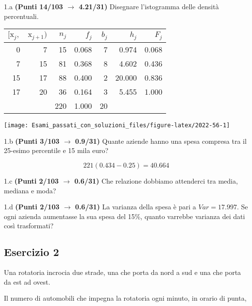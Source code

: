 \documentclass[
  11pt,
]{book}
\theoremstyle{mytheoremstyle}
\theoremstyle{mydefstyle}
\newenvironment{sol}
  {
  \begin{tcolorbox}[enhanced,breakable,arc=0.1mm,boxrule=1pt,colback=white,colframe=iblue,
  title=\bf \fontfamily{lmss}\selectfont \hspace{.5 cm} Soluzione,drop fuzzy shadow]

}{
\end{tcolorbox}
  }
\begin{document}
1.a \textbf{(Punti 14/103 \(\rightarrow\) 4.21/31)} Disegnare l'istogramma delle densità percentuali.

\begin{sol}

\begin{table}[H]
\centering
\begin{tabular}{rrrrrrr}
\toprule
$[\text{x}_j,$ & $\text{x}_{j+1})$ & $n_j$ & $f_j$ & $b_j$ & $h_j$ & $F_j$\\
\midrule
0 & 7 & 15 & 0.068 & 7 & 0.974 & 0.068\\
7 & 15 & 81 & 0.368 & 8 & 4.602 & 0.436\\
15 & 17 & 88 & 0.400 & 2 & 20.000 & 0.836\\
17 & 20 & 36 & 0.164 & 3 & 5.455 & 1.000\\
 &  & 220 & 1.000 & 20 &  & \\
\bottomrule
\end{tabular}
\end{table}

\begin{center}\texttt{[image: Esami\_passati\_con\_soluzioni\_files/figure-latex/2022-56-1]} \end{center}

\end{sol}

1.b \textbf{(Punti 3/103 \(\rightarrow\) 0.9/31)} Quante aziende hanno una spesa compresa tra il 25-esimo percentile e 15 mila euro?

\begin{sol}
\[
221(0.434-0.25)=40.664
\]

\end{sol}

1.c \textbf{(Punti 2/103 \(\rightarrow\) 0.6/31)} Che relazione dobbiamo attenderci tra media, mediana e moda?

1.d \textbf{(Punti 2/103 \(\rightarrow\) 0.6/31)} La varianza della spesa è pari a \(Var=17.997\).
Se ogni azienda aumentasse la sua spesa del 15\%, quanto varrebbe varianza dei dati così trasformati?

\subsection{Esercizio 2}\label{esercizio-2-15}

Una rotatoria incrocia due strade, una che porta da nord a sud e una che porta da est ad ovest.

Il numero di automobili che impegna la rotatoria ogni minuto, in orario di punta,
\end{document}
